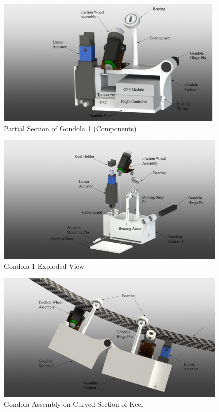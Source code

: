 \documentclass[../main.tex]{subfiles}
\begin{document}
\begin{figure}[H]
	\centering
	\includegraphics[width=.8\linewidth]{img/design/gondola/gondolaPartialSection.png}
	\caption{Partial Section of Gondola 1 (Components)}
	\label{fig:gondolaPartialSection}
\end{figure}

\begin{figure}[H]
	\centering
	\includegraphics[width=.8\linewidth]{img/design/gondola/gondola1ExplodedView.png}
	\caption{Gondola 1 Exploded View}
	\label{fig:gondola1ExplodedView}
\end{figure}

\begin{figure}[H]
	\centering
	\includegraphics[width=.8\linewidth]{img/design/gondola/gondolaBent.png}
	\caption{Gondola Assembly on Curved Section of Keel}
	\label{fig:gondolaBent}
\end{figure}
\end{document}
